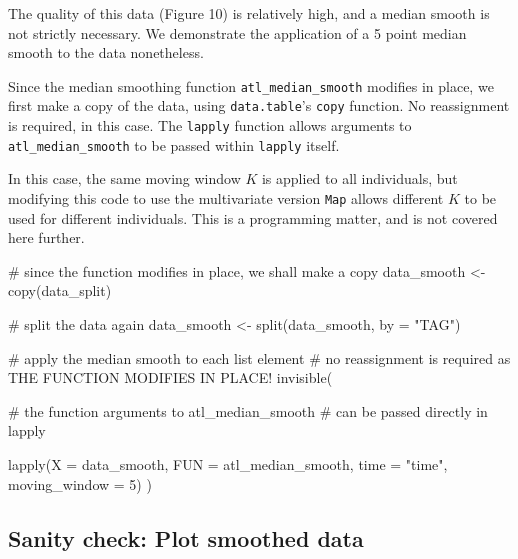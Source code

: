 \documentclass[]{scrreprt}
\newenvironment{Shaded}{}{}
\newcommand{\CommentTok}[1]{\textcolor[rgb]{0.00,0.50,0.00}{#1}}
\newcommand{\DataTypeTok}[1]{#1}
\newcommand{\DecValTok}[1]{#1}
\newcommand{\KeywordTok}[1]{\textcolor[rgb]{0.00,0.00,1.00}{#1}}
\newcommand{\NormalTok}[1]{#1}
\newcommand{\StringTok}[1]{\textcolor[rgb]{0.00,0.50,0.50}{#1}}
\begin{document}
The quality of this data (Figure 10) is relatively high, and a median smooth is not strictly necessary. We demonstrate the application of a 5 point median smooth to the data nonetheless.

Since the median smoothing function \texttt{atl\_median\_smooth} modifies in place, we first make a copy of the data, using \texttt{data.table}'s \texttt{copy} function.
No reassignment is required, in this case. The \texttt{lapply} function allows arguments to \texttt{atl\_median\_smooth} to be passed within \texttt{lapply} itself.

In this case, the same moving window \(K\) is applied to all individuals, but modifying this code to use the multivariate version \texttt{Map} allows different \(K\) to be used for different individuals. This is a programming matter, and is not covered here further.

\begin{Shaded}
\begin{Highlighting}[]
\CommentTok{# since the function modifies in place, we shall make a copy}
\NormalTok{data_smooth <-}\StringTok{ }\KeywordTok{copy}\NormalTok{(data_split)}

\CommentTok{# split the data again}
\NormalTok{data_smooth <-}\StringTok{ }\KeywordTok{split}\NormalTok{(data_smooth, }\DataTypeTok{by =} \StringTok{"TAG"}\NormalTok{)}
\end{Highlighting}
\end{Shaded}

\begin{Shaded}
\begin{Highlighting}[]
\CommentTok{# apply the median smooth to each list element}
\CommentTok{# no reassignment is required as THE FUNCTION MODIFIES IN PLACE!}
\KeywordTok{invisible}\NormalTok{(}
  
  \CommentTok{# the function arguments to atl_median_smooth}
  \CommentTok{# can be passed directly in lapply}
  
  \KeywordTok{lapply}\NormalTok{(}\DataTypeTok{X =}\NormalTok{ data_smooth, }
         \DataTypeTok{FUN =}\NormalTok{ atl_median_smooth,}
         \DataTypeTok{time =} \StringTok{"time"}\NormalTok{, }\DataTypeTok{moving_window =} \DecValTok{5}\NormalTok{)}
\NormalTok{)}
\end{Highlighting}
\end{Shaded}

\hypertarget{sanity-check-plot-smoothed-data}{%
\subsection{Sanity check: Plot smoothed data}\label{sanity-check-plot-smoothed-data}}
\end{document}
